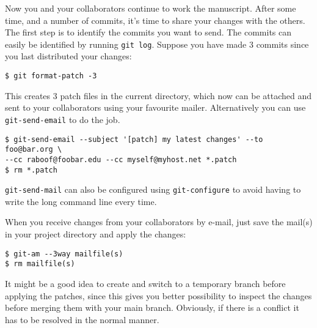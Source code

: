 \documentclass[a4paper,10pt]{article}
\begin{document}
Now you and your collaborators continue to work the manuscript. After some
time, and a number of commits, it's time to share your changes with the 
others. The first step is to identify the commits you want to send. The
commits can easily be identified by running \texttt{git log}. Suppose you have
made 3 commits since you last distributed your changes:
\begin{verbatim}
$ git format-patch -3
\end{verbatim}
This creates 3 patch files in the current directory, which now can be attached
and sent to your collaborators using your favourite mailer. Alternatively you
can use \texttt{git-send-email} to do the job.
\begin{verbatim}
$ git-send-email --subject '[patch] my latest changes' --to foo@bar.org \
--cc raboof@foobar.edu --cc myself@myhost.net *.patch
$ rm *.patch
\end{verbatim}
\texttt{git-send-mail} can also be configured using \texttt{git-configure} to
avoid having to write the long command line every time.

When you receive changes from your collaborators by e-mail, just save the
mail(s) in your project directory and apply the changes:
\begin{verbatim}
$ git-am --3way mailfile(s)
$ rm mailfile(s)
\end{verbatim}
It might be a good idea to create and switch to a temporary branch before 
applying the patches, since this gives you better possibility to inspect the 
changes before merging them with your main branch. Obviously, if there is a
conflict it has to be resolved in the normal manner.
\end{document}
